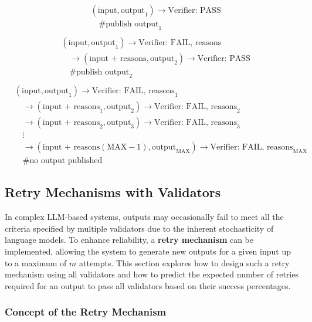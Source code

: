 \documentclass{article}
\begin{document}
\begin{align*}
&(\text{input}, \text{output}_1) \rightarrow \text{Verifier: PASS} \\
&\quad \text{\# publish output}_1 \\
\end{align*}
\begin{align*}
&(\text{input}, \text{output}_1) \rightarrow \text{Verifier: FAIL, reasons} \\
&\quad \rightarrow (\text{input + reasons}, \text{output}_2) \rightarrow \text{Verifier: PASS} \\
&\quad \text{\# publish output}_2 \\
\end{align*}
\begin{align*}
&(\text{input}, \text{output}_1) \rightarrow \text{Verifier: FAIL, reasons}_1 \\
&\quad \rightarrow (\text{input + reasons}_1, \text{output}_2) \rightarrow \text{Verifier: FAIL, reasons}_2 \\
&\quad \rightarrow (\text{input + reasons}_2, \text{output}_3) \rightarrow \text{Verifier: FAIL, reasons}_3 \\
&\quad \vdots \\
&\quad \rightarrow (\text{input + reasons}(\text{MAX}-1), \text{output}_\text{MAX}) \rightarrow \text{Verifier: FAIL, reasons}_\text{MAX} \\
&\quad \text{\# no output published}
\end{align*}


\subsection{Retry Mechanisms with Validators}

In complex LLM-based systems, outputs may occasionally fail to meet all the criteria specified by multiple validators due to the inherent stochasticity of language models. To enhance reliability, a \textbf{retry mechanism} can be implemented, allowing the system to generate new outputs for a given input up to a maximum of \( m \) attempts. This section explores how to design such a retry mechanism using all validators and how to predict the expected number of retries required for an output to pass all validators based on their success percentages.

\pagebreak
\subsubsection{Concept of the Retry Mechanism}
\end{document}
